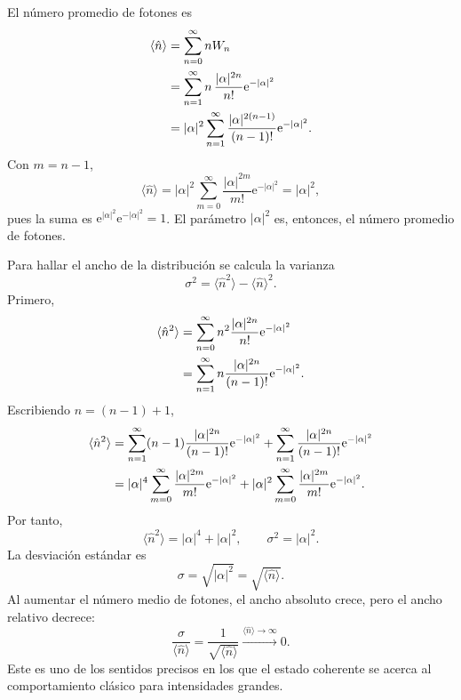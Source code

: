 \documentclass[11pt]{article}
\newcommand{\ee}{\mathrm{e}}
\begin{document}
El n\'umero promedio de fotones es
\begin{align}
  \langle \hat n\rangle
  &=
  \sum_{n=0}^{\infty} nW_n \notag\\
  &=
  \sum_{n=1}^{\infty}
  n\,
  \frac{|\alpha|^{2n}}{n!}\ee^{-|\alpha|^2} \notag\\
  &=
  |\alpha|^2
  \sum_{n=1}^{\infty}
  \frac{|\alpha|^{2(n-1)}}{(n-1)!}\ee^{-|\alpha|^2}.
\end{align}
Con $m=n-1$,
\begin{equation}
  \langle \hat n\rangle
  =
  |\alpha|^2
  \sum_{m=0}^{\infty}
  \frac{|\alpha|^{2m}}{m!}\ee^{-|\alpha|^2}
  =
  |\alpha|^2,
\end{equation}
pues la suma es $\ee^{|\alpha|^2}\ee^{-|\alpha|^2}=1$.
El par\'ametro $|\alpha|^2$ es, entonces, el n\'umero promedio de fotones.

Para hallar el ancho de la distribuci\'on se calcula la varianza
\begin{equation}
  \sigma^2
  =
  \langle \hat n^2\rangle-\langle\hat n\rangle^2.
\end{equation}
Primero,
\begin{align}
  \langle\hat n^2\rangle
  &=
  \sum_{n=0}^{\infty}
  n^2
  \frac{|\alpha|^{2n}}{n!}\ee^{-|\alpha|^2} \notag\\
  &=
  \sum_{n=1}^{\infty}
  n
  \frac{|\alpha|^{2n}}{(n-1)!}\ee^{-|\alpha|^2}.
\end{align}
Escribiendo $n=(n-1)+1$,
\begin{align}
  \langle\hat n^2\rangle
  &=
  \sum_{n=1}^{\infty}
  (n-1)
  \frac{|\alpha|^{2n}}{(n-1)!}\ee^{-|\alpha|^2}
  +
  \sum_{n=1}^{\infty}
  \frac{|\alpha|^{2n}}{(n-1)!}\ee^{-|\alpha|^2} \notag\\
  &=
  |\alpha|^4
  \sum_{m=0}^{\infty}
  \frac{|\alpha|^{2m}}{m!}\ee^{-|\alpha|^2}
  +
  |\alpha|^2
  \sum_{m=0}^{\infty}
  \frac{|\alpha|^{2m}}{m!}\ee^{-|\alpha|^2}.
\end{align}
Por tanto,
\begin{equation}
  \langle\hat n^2\rangle=|\alpha|^4+|\alpha|^2,
  \qquad
  \boxed{\sigma^2=|\alpha|^2.}
\end{equation}
La desviaci\'on est\'andar es
\begin{equation}
  \sigma=\sqrt{|\alpha|^2}=\sqrt{\langle\hat n\rangle}.
\end{equation}
Al aumentar el n\'umero medio de fotones, el ancho absoluto crece, pero el
ancho relativo decrece:
\begin{equation}
  \frac{\sigma}{\langle\hat n\rangle}
  =
  \frac{1}{\sqrt{\langle\hat n\rangle}}
  \xrightarrow{\langle\hat n\rangle\to\infty}0.
\end{equation}
Este es uno de los sentidos precisos en los que el estado coherente se acerca
al comportamiento cl\'asico para intensidades grandes.
\end{document}
